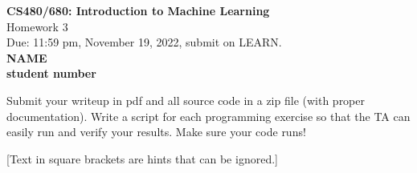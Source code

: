 \documentclass[10pt]{article}
\newcommand{\red}[1]{{\color{red}#1}}
\newcommand{\green}[1]{{\color{green}#1}}
\begin{document}
	
	\begin{center}
		\large{\textbf{CS480/680: Introduction to Machine Learning} \\ Homework 3\\ \red{Due: 11:59 pm, November 19, 2022}, \red{submit on LEARN}.} \\
		
		{\bf \green{NAME}} \\
		{\bf \green{student number}}
		
	\end{center}
	
	\begin{center}
		Submit your writeup in pdf and all source code in a zip file (with proper documentation). Write a script for each programming exercise so that the TA can easily run and verify your results. Make sure your code runs!
		
		[Text in square brackets are hints that can be ignored.]
	\end{center}
\end{document}
